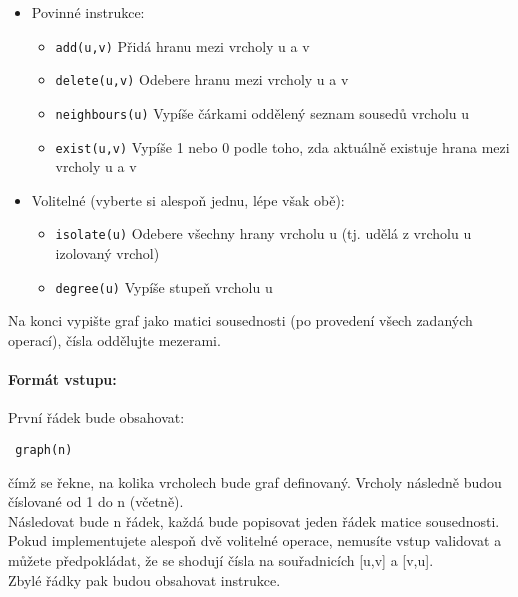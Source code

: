 \documentclass{scrartcl}
\begin{document}
        \begin{itemize}
                \item Povinné instrukce:
                \begin{itemize}
                \item \texttt{add(u,v)}           Přidá hranu mezi vrcholy u a v
                \item \texttt{delete(u,v)}        Odebere hranu mezi vrcholy u a v
                \item \texttt{neighbours(u)}      Vypíše čárkami oddělený seznam sousedů vrcholu u
                \item \texttt{exist(u,v)}         Vypíše 1 nebo 0 podle toho, zda aktuálně existuje hrana mezi vrcholy u a v
                \end{itemize}
                \item Volitelné (vyberte si alespoň jednu, lépe však obě):
                \begin{itemize}
                \item \texttt{isolate(u)}         Odebere všechny hrany vrcholu u (tj. udělá z vrcholu u izolovaný vrchol)
                \item \texttt{degree(u)}          Vypíše stupeň vrcholu u      
                \end{itemize}
                
        \end{itemize}        

Na konci vypište graf jako matici sousednosti (po provedení všech zadaných operací), čísla oddělujte mezerami.\\

\paragraph{Formát vstupu:}
První řádek bude obsahovat: 
\begin{lstlisting}
 graph(n)        
\end{lstlisting}
čímž se řekne, na kolika vrcholech bude graf definovaný. Vrcholy následně budou číslované od 1 do n (včetně). \\

Následovat bude n řádek, každá bude popisovat jeden řádek matice sousednosti. Pokud implementujete alespoň dvě volitelné operace, nemusíte vstup validovat a můžete předpokládat, že se shodují čísla na souřadnicích [u,v] a [v,u]. \\

Zbylé řádky pak budou obsahovat instrukce. 

        
        
\end{document}
